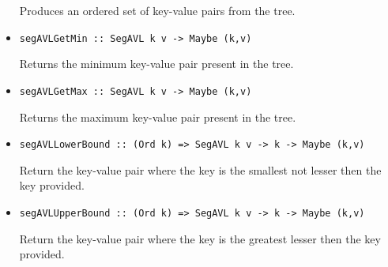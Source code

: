 \documentclass[a4paper,10pt,openany]{article}
\begin{document}
\begin{itemize}
Produces an ordered set of key-value pairs from the tree.
\item \begin{lstlisting}
segAVLGetMin :: SegAVL k v -> Maybe (k,v)
\end{lstlisting}
Returns the minimum key-value pair present in the tree.
\item \begin{lstlisting}
segAVLGetMax :: SegAVL k v -> Maybe (k,v)
\end{lstlisting}
Returns the maximum key-value pair present in the tree.
\item \begin{lstlisting}
segAVLLowerBound :: (Ord k) => SegAVL k v -> k -> Maybe (k,v)
\end{lstlisting}
Return the key-value pair where the key is the smallest not lesser then the key provided.
\item \begin{lstlisting}
segAVLUpperBound :: (Ord k) => SegAVL k v -> k -> Maybe (k,v)
\end{lstlisting}
Return the key-value pair where the key is the greatest lesser then the key provided.
\end{itemize}
\end{document}

